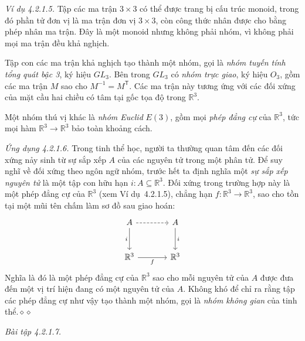 \noindent\textit{Ví dụ 4.2.1.5.} Tập các ma trận $3\times3$ có thể được trang bị cấu trúc monoid, trong đó phần tử đơn vị là ma trận đơn vị $3\times3$, còn công thức nhân được cho bằng phép nhân ma trận. Đây là một monoid nhưng không phải nhóm, vì không phải mọi ma trận đều khả nghịch.

Tập con các ma trận khả nghịch tạo thành một nhóm, gọi là \emph{nhóm tuyến tính tổng quát bậc 3}, ký hiệu $GL_3$. Bên trong $GL_3$ có \emph{nhóm trực giao}, ký hiệu $O_3$, gồm các ma trận $M$ sao cho $M^{-1}=M^{\mathsf{T}}$. Các ma trận này tương ứng với các đối xứng của mặt cầu hai chiều có tâm tại gốc tọa độ trong $\mathbb{R}^3$.

Một nhóm thú vị khác là \emph{nhóm Euclid} $E(3)$, gồm mọi \emph{phép đẳng cự} của $\mathbb{R}^3$, tức mọi hàm $\mathbb{R}^3\to\mathbb{R}^3$ bảo toàn khoảng cách.

\noindent\textit{Ứng dụng 4.2.1.6.} Trong tinh thể học, người ta thường quan tâm đến các đối xứng nảy sinh từ sự sắp xếp $A$ của các nguyên tử trong một phân tử. Để suy nghĩ về đối xứng theo ngôn ngữ
nhóm, trước hết ta định nghĩa một \emph{sự sắp xếp nguyên tử} là một tập con hữu hạn $i:A\subseteq\mathbb{R}^3$. Đối xứng trong trường hợp này là một phép đẳng cự của $\mathbb{R}^3$ (xem Ví dụ~4.2.1.5), chẳng hạn $f:\mathbb{R}^3\to\mathbb{R}^3$, sao cho tồn tại một mũi tên chấm làm sơ đồ sau giao hoán:
\[
\begin{tikzcd}[row sep=large,column sep=large]
A\arrow[r,dashed]\arrow[d,"i"']&A\arrow[d,"i"]\\
\mathbb{R}^3\arrow[r,"f"']&\mathbb{R}^3
\end{tikzcd}
\]
Nghĩa là đó là một phép đẳng cự của $\mathbb{R}^3$ sao cho mỗi nguyên tử của $A$ được đưa đến một vị trí hiện đang có một nguyên tử của $A$. Không khó để chỉ ra rằng tập các phép đẳng cự như vậy tạo thành một nhóm, gọi là \emph{nhóm không gian} của tinh thể.\nobreak\hfill$\diamond\diamond$

\noindent\textit{Bài tập 4.2.1.7.}\keepwithnext

